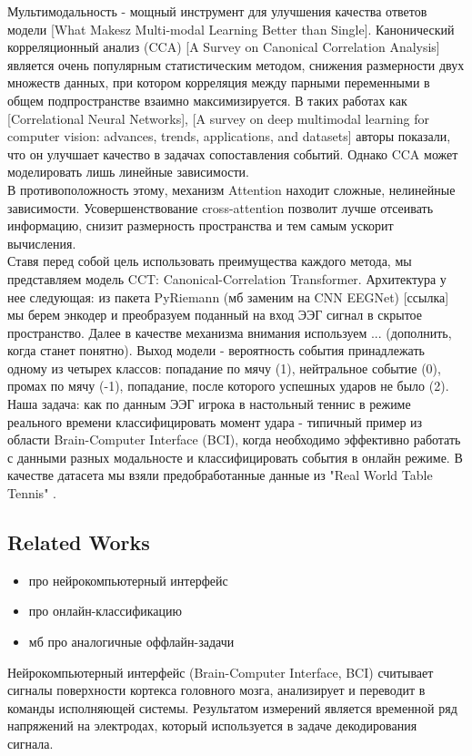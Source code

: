 \documentclass[a4paper,14pt]{article}
\theoremstyle{plain} %
\theoremstyle{definition} %
\theoremstyle{remark} %
\begin{document}
        Мультимодальность - мощный инструмент для улучшения качества ответов модели [What Makesz Multi-modal Learning Better than Single]. Канонический корреляционный анализ (CCA) [A Survey on Canonical Correlation Analysis] является очень популярным статистическим методом, снижения размерности двух множеств данных, при котором корреляция между парными переменными в общем подпространстве взаимно максимизируется. В таких работах как [Correlational Neural Networks], [A survey on deep multimodal learning for computer vision: advances, trends, applications, and datasets] авторы показали, что он улучшает качество в задачах сопоставления событий. Однако CCA может моделировать лишь линейные зависимости. \\
        В противоположность этому, механизм Attention находит сложные, нелинейные зависимости. Усовершенствование cross-attention позволит лучше отсеивать информацию, снизит размерность пространства и тем самым ускорит вычисления. \\
        Ставя перед собой цель использовать преимущества каждого метода, мы представляем модель CCT: Canonical-Correlation Transformer. Архитектура у нее следующая: из пакета PyRiemann (мб заменим на CNN EEGNet) [ссылка] мы берем энкодер и преобразуем поданный на вход ЭЭГ сигнал в скрытое пространство. Далее в качестве механизма внимания используем ... (дополнить, когда станет понятно). Выход модели - вероятность события принадлежать одному из четырех классов: попадание по мячу (1), нейтральное событие (0), промах по мячу (-1), попадание, после которого успешных ударов не было (2). \\    
        Наша задача: как по данным ЭЭГ игрока в настольный теннис в режиме реального времени классифицировать момент удара - типичный пример из области Brain-Computer Interface (BCI), когда необходимо эффективно работать с данными разных модальносте и классифицировать события в онлайн режиме. В качестве датасета мы взяли предобработанные данные из "Real World Table Tennis" \cite{amanda2024dataset}.\\

        \subsection{Related Works}
        \begin{itemize}
            \item про нейрокомпьютерный интерфейс
            \item про онлайн-классификацию
            \item мб про аналогичные оффлайн-задачи
        \end{itemize}
        Нейрокомпьютерный интерфейс (Brain-Computer Interface, BCI) \cite{shih2012brain} считывает сигналы поверхности кортекса головного мозга, анализирует и переводит в команды исполняющей системы. Результатом измерений является временной ряд напряжений на электродах, который используется в задаче декодирования сигнала. \\
\end{document}
